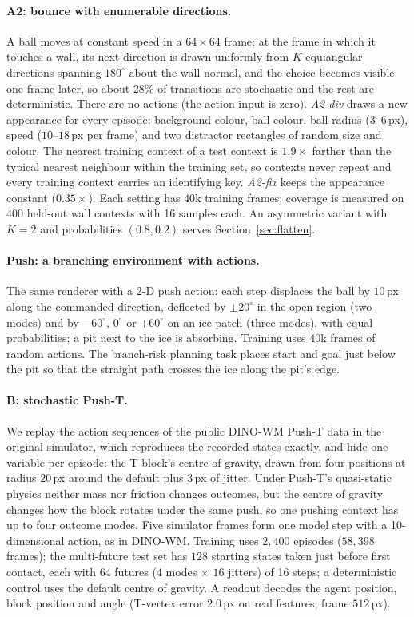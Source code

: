 \paragraph{A2: bounce with enumerable directions.}
A ball moves at constant speed in a $64\times64$ frame; at the frame in which it touches a wall, its next direction is drawn uniformly from $K$ equiangular directions spanning $180^\circ$ about the wall normal, and the choice becomes visible one frame later, so about $28\%$ of transitions are stochastic and the rest are deterministic. There are no actions (the action input is zero). \emph{A2-div} draws a new appearance for every episode: background colour, ball colour, ball radius ($3$--$6$\,px), speed ($10$--$18$\,px per frame) and two distractor rectangles of random size and colour. The nearest training context of a test context is $1.9\times$ farther than the typical nearest neighbour within the training set, so contexts never repeat and every training context carries an identifying key. \emph{A2-fix} keeps the appearance constant ($0.35\times$). Each setting has $40$k training frames; coverage is measured on $400$ held-out wall contexts with 16 samples each. An asymmetric variant with $K{=}2$ and probabilities $(0.8, 0.2)$ serves Section~\ref{sec:flatten}.

\paragraph{Push: a branching environment with actions.}
The same renderer with a 2-D push action: each step displaces the ball by $10$\,px along the commanded direction, deflected by $\pm20^\circ$ in the open region (two modes) and by $-60^\circ$, $0^\circ$ or $+60^\circ$ on an ice patch (three modes), with equal probabilities; a pit next to the ice is absorbing. Training uses $40$k frames of random actions. The branch-risk planning task places start and goal just below the pit so that the straight path crosses the ice along the pit's edge.

\paragraph{B: stochastic Push-T.}
We replay the action sequences of the public DINO-WM Push-T data \citep{zhou2025dinowm} in the original simulator, which reproduces the recorded states exactly, and hide one variable per episode: the T block's centre of gravity, drawn from four positions at radius $20$\,px around the default plus $3$\,px of jitter. Under Push-T's quasi-static physics neither mass nor friction changes outcomes, but the centre of gravity changes how the block rotates under the same push, so one pushing context has up to four outcome modes. Five simulator frames form one model step with a 10-dimensional action, as in DINO-WM. Training uses $2{,}400$ episodes ($58{,}398$ frames); the multi-future test set has $128$ starting states taken just before first contact, each with $64$ futures ($4$ modes $\times$ $16$ jitters) of 16 steps; a deterministic control uses the default centre of gravity. A readout decodes the agent position, block position and angle (T-vertex error $2.0$\,px on real features, frame $512$\,px).

